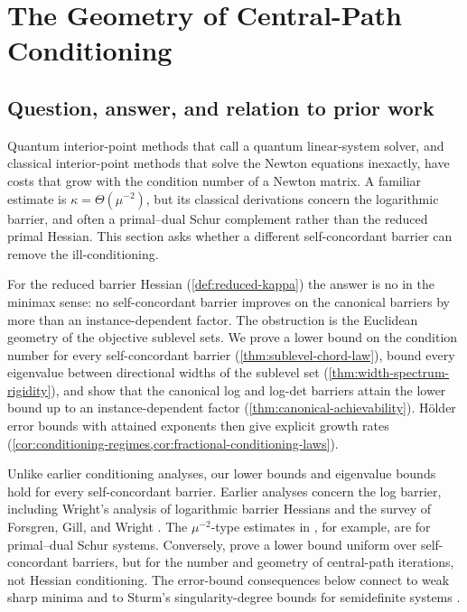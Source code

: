 \section{The Geometry of Central-Path Conditioning}
\label{sec:conditioning}

\subsection{Question, answer, and relation to prior work}
\label{sec:conditioning-overview}

Quantum interior-point methods that call a quantum linear-system solver, and
classical interior-point methods that solve the Newton equations inexactly,
have costs that grow with the condition number of a Newton matrix.  A familiar
estimate is $\kappa=\Theta(\mu^{-2})$, but its classical derivations concern
the logarithmic barrier, and often a primal--dual Schur complement rather than
the reduced primal Hessian.  This section asks whether a different
self-concordant barrier can remove the ill-conditioning.

For the reduced barrier Hessian (\cref{def:reduced-kappa}) the answer is no
in the minimax sense: no self-concordant barrier improves on the canonical
barriers by more than an instance-dependent factor.
The obstruction is the Euclidean geometry of the objective sublevel sets.  We
prove a lower bound on the condition number for every self-concordant
barrier (\cref{thm:sublevel-chord-law}), bound every eigenvalue between
directional widths of the sublevel set (\cref{thm:width-spectrum-rigidity}),
and show that the canonical log and log-det barriers attain the lower bound
up to an instance-dependent factor (\cref{thm:canonical-achievability}).
H\"older error bounds with attained exponents then give explicit growth rates
(\cref{cor:conditioning-regimes,cor:fractional-conditioning-laws}).

Unlike earlier conditioning analyses, our lower bounds and eigenvalue bounds
hold for every self-concordant barrier.  Earlier analyses concern the
log barrier, including Wright's analysis of logarithmic
barrier Hessians and the survey of Forsgren, Gill, and Wright
\cite{wright1994-properties-hessian-logarithmic-barrier,forsgren2002-interior-methods-nonlinear-optimization}.
The $\mu^{-2}$-type estimates in
\citet[Section~7.4]{augustino2023-quantum-interior-point-methods-semidefinite},
for example, are for primal--dual Schur systems.  Conversely,
\citet{allamigeon2022-no-self-concordant-barrier} prove a lower bound uniform
over self-concordant barriers, but for the number and geometry of central-path
iterations, not Hessian conditioning.  The error-bound consequences below
connect to weak sharp minima \cite{burke1993-weak-sharp-minima} and to Sturm's
singularity-degree bounds for semidefinite systems
\cite{sturm2000-error-bounds-linear-matrix-inequalities}.

